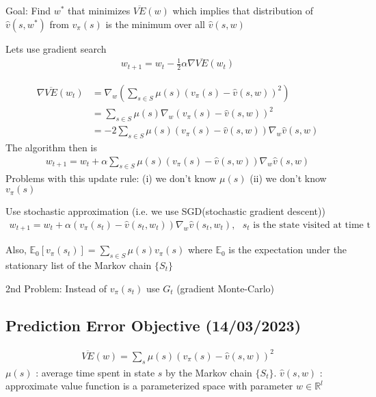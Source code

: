 \documentclass[11pt]{article}
\begin{document}
Goal: Find \(w^{*}\) that minimizes \(\overline{VE}(w)\) which implies that distribution of \(\hat{v}(s, w^{*})\) from \(v_{\pi}(s)\) is the minimum over all \(\hat{v}(s, w)\)

Lets use gradient search
\begin{align*}
w_{t+1} = w_t - \frac{1}{2} \alpha \nabla \overline{VE}(w_t)
\end{align*}

\begin{align*}
\nabla \overline{VE}(w_t) &= \nabla_w \left( \sum_{s \in S} \mu(s)(v_{\pi}(s) - \hat{v}(s, w))^2 \right) \\
                          &= \sum_{s \in S} \mu(s)\nabla_w (v_{\pi}(s) - \hat{v}(s, w))^2 \\
                          &= -2 \sum_{s \in S} \mu(s)(v_{\pi}(s) - \hat{v}(s, w)) \nabla_w \hat{v}(s, w)
\end{align*}
The algorithm then is
\begin{align*}
w_{t+1} = w_t + \alpha \sum_{s \in S} \mu(s)(v_{\pi}(s) - \hat{v}(s, w)) \nabla_w \hat{v}(s, w)
\end{align*}
Problems with this update rule:
(i) we don't know \(\mu(s)\)
(ii) we don't know \(v_{\pi}(s)\)

Use stochastic approximation (i.e. we use SGD(stochastic gradient descent))
\begin{align*}
w_{t+1} = w_t + \alpha (v_{\pi}(s_t) - \hat{v}(s_t, w_t)) \nabla_w \hat{v}(s_t, w_t), \text{ $s_t$ is the state visited at time t}
\end{align*}

Also, \(\mathbb{E}_0 [v_{\pi}(s_t)] = \sum_{s \in S}\mu(s) v_{\pi}(s)\) where \(\mathbb{E}_0\) is the expectation under the stationary list of the Markov chain \(\{S_t\}\)

2nd Problem: Instead of \(v_{\pi}(s_t)\) use \(G_t\) (gradient Monte-Carlo)


\subsection{Prediction Error Objective (14/03/2023)}
\label{sec:org85af530}
\begin{align*}
\overline{VE}(w) = \sum_s \mu(s) \left( v_{\pi}(s) - \hat{v}(s, w) \right)^2
\end{align*}
\(\mu(s)\) : average time spent in state \(s\) by the Markov chain \(\{S_t\}\).
\(\hat{v}(s, w)\) : approximate value function is a parameterized space with parameter \(w \in \mathbb{R}^l\)
\end{document}
